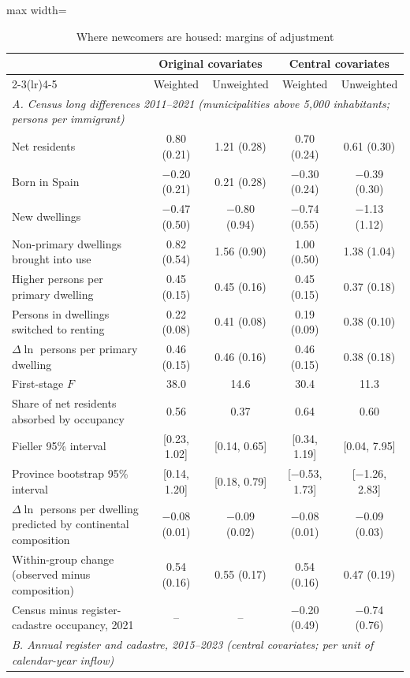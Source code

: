 \begin{table}[!htbp]\centering\small
\caption{Where newcomers are housed: margins of adjustment}\label{tab:margins}
\begin{adjustbox}{max width=\linewidth}\begin{tabular}{lcccc}\toprule
 & \multicolumn{2}{c}{Original covariates} & \multicolumn{2}{c}{Central covariates}\\\cmidrule(lr){2-3}\cmidrule(lr){4-5}
 & Weighted & Unweighted & Weighted & Unweighted\\\midrule
\multicolumn{5}{l}{\textit{A. Census long differences 2011--2021 (municipalities above 5,000 inhabitants; persons per immigrant)}}\\
Net residents & 0.80 (0.21) & 1.21 (0.28) & 0.70 (0.24) & 0.61 (0.30)\\
Born in Spain & $-$0.20 (0.21) & 0.21 (0.28) & $-$0.30 (0.24) & $-$0.39 (0.30)\\
New dwellings & $-$0.47 (0.50) & $-$0.80 (0.94) & $-$0.74 (0.55) & $-$1.13 (1.12)\\
Non-primary dwellings brought into use & 0.82 (0.54) & 1.56 (0.90) & 1.00 (0.50) & 1.38 (1.04)\\
Higher persons per primary dwelling & 0.45 (0.15) & 0.45 (0.16) & 0.45 (0.15) & 0.37 (0.18)\\
Persons in dwellings switched to renting & 0.22 (0.08) & 0.41 (0.08) & 0.19 (0.09) & 0.38 (0.10)\\
$\Delta\ln$ persons per primary dwelling & 0.46 (0.15) & 0.46 (0.16) & 0.46 (0.15) & 0.38 (0.18)\\
First-stage $F$ & 38.0 & 14.6 & 30.4 & 11.3\\
Share of net residents absorbed by occupancy & 0.56 & 0.37 & 0.64 & 0.60\\
\quad Fieller 95\% interval & [0.23, 1.02] & [0.14, 0.65] & [0.34, 1.19] & [0.04, 7.95]\\
\quad Province bootstrap 95\% interval & [0.14, 1.20] & [0.18, 0.79] & [$-$0.53, 1.73] & [$-$1.26, 2.83]\\
$\Delta\ln$ persons per dwelling predicted by continental composition & $-$0.08 (0.01) & $-$0.09 (0.02) & $-$0.08 (0.01) & $-$0.09 (0.03)\\
Within-group change (observed minus composition) & 0.54 (0.16) & 0.55 (0.17) & 0.54 (0.16) & 0.47 (0.19)\\
Census minus register-cadastre occupancy, 2021 & -- & -- & $-$0.20 (0.49) & $-$0.74 (0.76)\\
\midrule\multicolumn{5}{l}{\textit{B. Annual register and cadastre, 2015--2023 (central covariates; per unit of calendar-year inflow)}}\\

\end{tabular}
\end{adjustbox}
\end{table}
